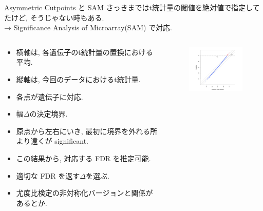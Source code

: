 \documentclass[dvipdfmx,8pt]{beamer}
\begin{document}
  \begin{frame}{Asymmetric Cutpoints と SAM}
    さっきまではt統計量の閾値を絶対値で指定してたけど, そうじゃない時もある. \\
    → Significance Analysis of Microarray(SAM) で対応.
    \begin{columns}
      \begin{column}{0.5\columnwidth}
        \begin{itemize}
          \item 横軸は, 各遺伝子のt統計量の置換における平均.
          \item 縦軸は, 今回のデータにおけるt統計量.
          \item 各点が遺伝子に対応.
          \item 幅$\Delta$の決定境界.
          \item 原点から左右にいき, 最初に境界を外れる所より遠くが significant.
          \item この結果から, 対応する FDR を推定可能.
          \item 適切な FDR を返す$\Delta$を選ぶ.
          \item 尤度比検定の非対称化バージョンと関係があるとか.
        \end{itemize}
      \end{column}
      \begin{column}{0.5\columnwidth}
        \begin{figure}[htb]
          \centering
          \includegraphics[width=5cm]{./images/sam-plot-t.png}
        \end{figure}
      \end{column}
    \end{columns}
  \end{frame}
\end{document}
